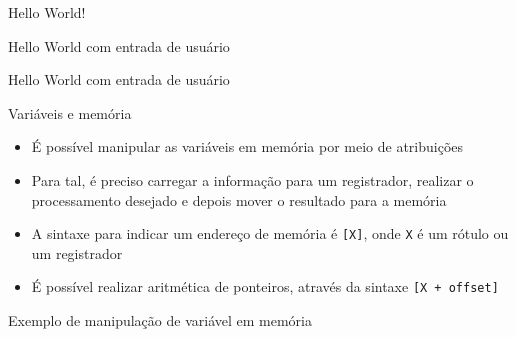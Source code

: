 \begin{frame}[fragile]{Hello World!}
\end{frame}

\begin{frame}[fragile]{Hello World com entrada de usuário}
\end{frame}

\begin{frame}[fragile]{Hello World com entrada de usuário}
\end{frame}

\begin{frame}[fragile]{Variáveis e memória}

    \begin{itemize}
        \item É possível manipular as variáveis em memória por meio de atribuições

        \item Para tal, é preciso carregar a informação para um registrador, realizar o
            processamento desejado e depois mover o resultado para a memória

        \item A sintaxe para indicar um endereço de memória é \texttt{[X]}, onde 
            \texttt{X} é um rótulo ou um registrador

        \item É possível realizar aritmética de ponteiros, através da sintaxe
            \texttt{[X + offset]}
    \end{itemize}

\end{frame}

\begin{frame}[fragile]{Exemplo de manipulação de variável em memória}
\end{frame}
